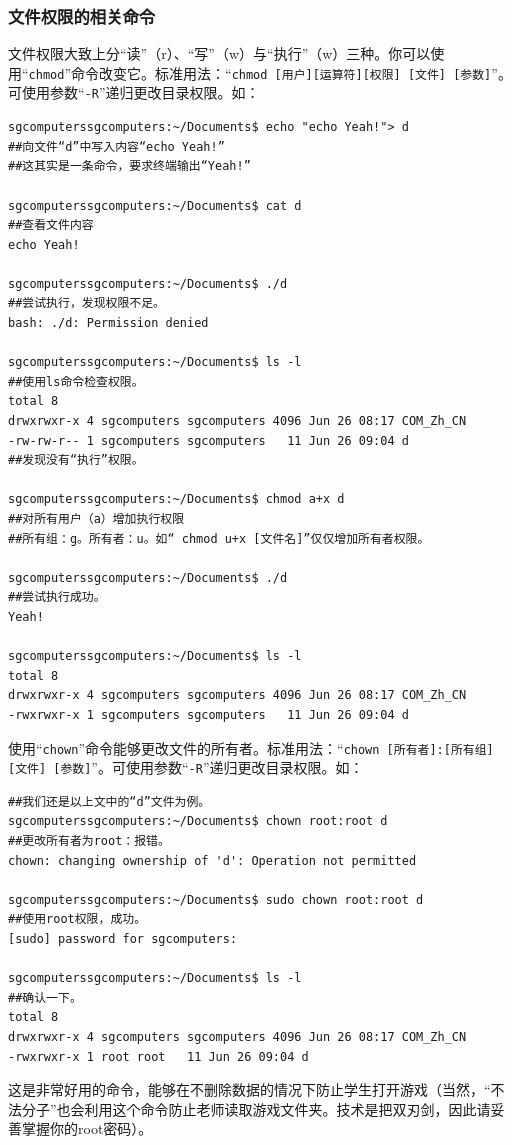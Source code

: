 \subsubsection{文件权限的相关命令}
文件权限大致上分“读”（r）、“写”（w）与“执行”（w）三种。你可以使用“\verb|chmod|”命令改变它。标准用法：“\verb|chmod [用户][运算符][权限] [文件] [参数]|”。可使用参数“\verb|-R|”递归更改目录权限。如：
\begin{verbatim}
sgcomputerssgcomputers:~/Documents$ echo "echo Yeah!"> d
##向文件“d”中写入内容“echo Yeah!”
##这其实是一条命令，要求终端输出“Yeah!”

sgcomputerssgcomputers:~/Documents$ cat d
##查看文件内容
echo Yeah!

sgcomputerssgcomputers:~/Documents$ ./d
##尝试执行，发现权限不足。
bash: ./d: Permission denied

sgcomputerssgcomputers:~/Documents$ ls -l
##使用ls命令检查权限。
total 8
drwxrwxr-x 4 sgcomputers sgcomputers 4096 Jun 26 08:17 COM_Zh_CN
-rw-rw-r-- 1 sgcomputers sgcomputers   11 Jun 26 09:04 d
##发现没有“执行”权限。

sgcomputerssgcomputers:~/Documents$ chmod a+x d
##对所有用户（a）增加执行权限
##所有组：g。所有者：u。如“ chmod u+x [文件名]”仅仅增加所有者权限。

sgcomputerssgcomputers:~/Documents$ ./d
##尝试执行成功。
Yeah!

sgcomputerssgcomputers:~/Documents$ ls -l
total 8
drwxrwxr-x 4 sgcomputers sgcomputers 4096 Jun 26 08:17 COM_Zh_CN
-rwxrwxr-x 1 sgcomputers sgcomputers   11 Jun 26 09:04 d

\end{verbatim} \par
使用“\verb|chown|”命令能够更改文件的所有者。标准用法：“\verb|chown [所有者]:[所有组] [文件] [参数]|”。可使用参数“\verb|-R|”递归更改目录权限。如：
\begin{verbatim}
##我们还是以上文中的“d”文件为例。
sgcomputerssgcomputers:~/Documents$ chown root:root d
##更改所有者为root：报错。
chown: changing ownership of 'd': Operation not permitted

sgcomputerssgcomputers:~/Documents$ sudo chown root:root d
##使用root权限，成功。
[sudo] password for sgcomputers: 

sgcomputerssgcomputers:~/Documents$ ls -l
##确认一下。
total 8
drwxrwxr-x 4 sgcomputers sgcomputers 4096 Jun 26 08:17 COM_Zh_CN
-rwxrwxr-x 1 root root   11 Jun 26 09:04 d
\end{verbatim} \par
这是非常好用的命令，能够在不删除数据的情况下防止学生打开游戏（当然，“不法分子”也会利用这个命令防止老师读取游戏文件夹。技术是把双刃剑，因此请妥善掌握你的root密码）。
